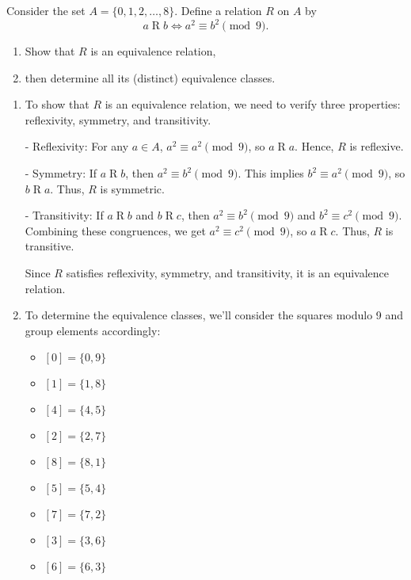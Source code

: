 \documentclass{article}
\theoremstyle{definition}
\begin{document}
\begin{question}
    Consider the set $A = \{0, 1, 2, \dots, 8 \}$. Define a relation $R$ on $A$ by
	\[
	a\mathrel{R}b \iff a^2 \equiv b^2 \pmod{9}.
	\]
	\begin{enumerate}
	\item Show that $R$ is an equivalence relation, 
	\item then determine all its (distinct) equivalence classes.
	\end{enumerate}
\end{question}
\begin{solution}
\begin{enumerate}
    \item To show that \(R\) is an equivalence relation, we need to verify three properties: reflexivity, symmetry, and transitivity.
    
    - Reflexivity: For any \(a \in A\), \(a^2 \equiv a^2 \pmod{9}\), so \(a \mathrel{R} a\). Hence, \(R\) is reflexive.
    
    - Symmetry: If \(a \mathrel{R} b\), then \(a^2 \equiv b^2 \pmod{9}\). This implies \(b^2 \equiv a^2 \pmod{9}\), so \(b \mathrel{R} a\). Thus, \(R\) is symmetric.
    
    - Transitivity: If \(a \mathrel{R} b\) and \(b \mathrel{R} c\), then \(a^2 \equiv b^2 \pmod{9}\) and \(b^2 \equiv c^2 \pmod{9}\). Combining these congruences, we get \(a^2 \equiv c^2 \pmod{9}\), so \(a \mathrel{R} c\). Thus, \(R\) is transitive.
    
    Since \(R\) satisfies reflexivity, symmetry, and transitivity, it is an equivalence relation.
    
    \item To determine the equivalence classes, we'll consider the squares modulo 9 and group elements accordingly:
    \begin{itemize}
    \item  \( [0] = \{0, 9\} \)
    \item  \( [1] = \{1, 8\} \)
    \item  \( [4] = \{4, 5\} \)
    \item  \( [2] = \{2, 7\} \)
    \item  \( [8] = \{8, 1\} \)
    \item  \( [5] = \{5, 4\} \)
    \item  \( [7] = \{7, 2\} \)
    \item  \( [3] = \{3, 6\} \)
    \item  \( [6] = \{6, 3\} \)
    \end{itemize}
\end{enumerate}
\end{solution}
\end{document}

